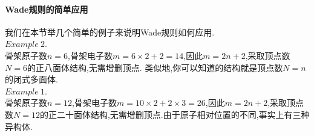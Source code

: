 \documentclass{ctexart}
\begin{document}
\paragraph{Wade规则的简单应用}
我们在本节举几个简单的例子来说明Wade规则如何应用.\\
$\mathit{Example\ 2.}$\ \\
\indent 骨架原子数$n=6$,骨架电子数$m=6\times2+2=14$,因此$m=2n+2$,采取顶点数$N=6$的正八面体结构,无需增删顶点.
类似地,你可以知道的结构就是顶点数$N=n$的闭式多面体.\\
$\mathit{Example\ 1.}$\ \\
\indent 骨架原子数$n=12$,骨架电子数$m=10\times2+2\times3=26$,因此$m=2n+2$,采取顶点数$N=12$的正二十面体结构,无需增删顶点.由于原子相对位置的不同,事实上有三种异构体.
\end{document}
